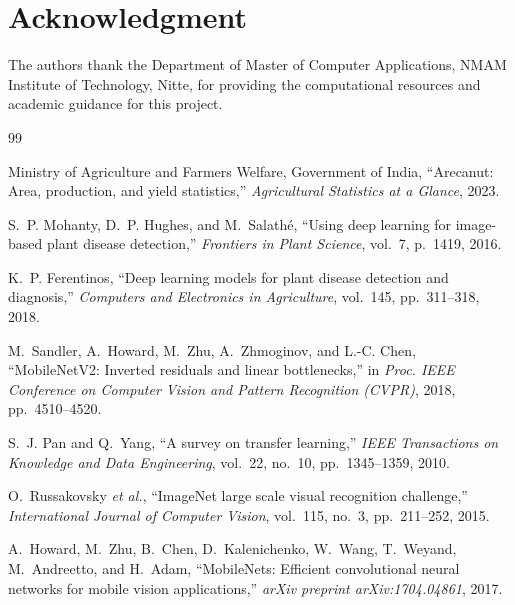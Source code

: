 \documentclass[conference]{IEEEtran}
\begin{document}
\section*{Acknowledgment}

The authors thank the Department of Master of Computer Applications, NMAM Institute of Technology, Nitte, for providing the computational resources and academic guidance for this project.



\begin{thebibliography}{99}

Ministry of Agriculture and Farmers Welfare, Government of India, ``Arecanut: Area, production, and yield statistics,'' \textit{Agricultural Statistics at a Glance}, 2023.

S.~P. Mohanty, D.~P. Hughes, and M.~Salath\'{e}, ``Using deep learning for image-based plant disease detection,'' \textit{Frontiers in Plant Science}, vol.~7, p.~1419, 2016.

K.~P. Ferentinos, ``Deep learning models for plant disease detection and diagnosis,'' \textit{Computers and Electronics in Agriculture}, vol.~145, pp.~311--318, 2018.

M.~Sandler, A.~Howard, M.~Zhu, A.~Zhmoginov, and L.-C. Chen, ``MobileNetV2: Inverted residuals and linear bottlenecks,'' in \textit{Proc. IEEE Conference on Computer Vision and Pattern Recognition (CVPR)}, 2018, pp.~4510--4520.

S.~J. Pan and Q.~Yang, ``A survey on transfer learning,'' \textit{IEEE Transactions on Knowledge and Data Engineering}, vol.~22, no.~10, pp.~1345--1359, 2010.

O.~Russakovsky \textit{et al.}, ``ImageNet large scale visual recognition challenge,'' \textit{International Journal of Computer Vision}, vol.~115, no.~3, pp.~211--252, 2015.

A.~Howard, M.~Zhu, B.~Chen, D.~Kalenichenko, W.~Wang, T.~Weyand, M.~Andreetto, and H.~Adam, ``MobileNets: Efficient convolutional neural networks for mobile vision applications,'' \textit{arXiv preprint arXiv:1704.04861}, 2017.


\end{thebibliography}
\end{document}
